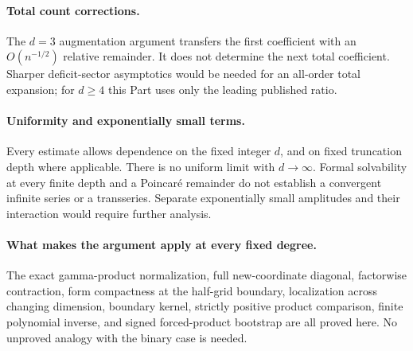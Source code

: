 \documentclass[11pt,letterpaper]{article}
\theoremstyle{remark}
\begin{document}
\paragraph{Total count corrections.}
The $d=3$ augmentation argument transfers the first coefficient with an $O(n^{-1/2})$ relative remainder. It does not determine the next total coefficient. Sharper deficit-sector asymptotics would be needed for an all-order total expansion; for $d\ge4$ this Part uses only the leading published ratio.

\paragraph{Uniformity and exponentially small terms.}
Every estimate allows dependence on the fixed integer $d$, and on fixed truncation depth where applicable. There is no uniform limit with $d\to\infty$. Formal solvability at every finite depth and a Poincar\'e remainder do not establish a convergent infinite series or a transseries. Separate exponentially small amplitudes and their interaction would require further analysis.

\paragraph{What makes the argument apply at every fixed degree.}
The exact gamma-product normalization, full new-coordinate diagonal, factorwise contraction, form compactness at the half-grid boundary, localization across changing dimension, boundary kernel, strictly positive product comparison, finite polynomial inverse, and signed forced-product bootstrap are all proved here. No unproved analogy with the binary case is needed.
\end{document}
